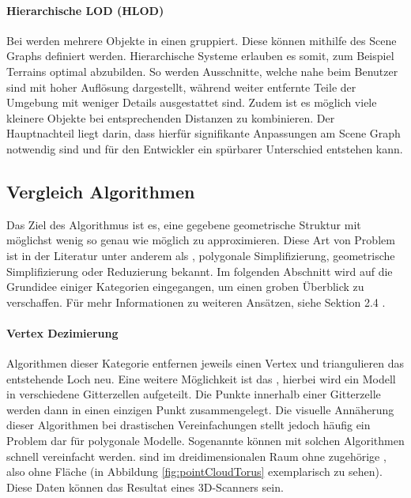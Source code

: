 \paragraph{Hierarchische LOD (HLOD)}
Bei  werden mehrere Objekte in einen  gruppiert. Diese  können mithilfe des \glspl{Scene Graph} definiert werden.
Hierarchische Systeme erlauben es somit, zum Beispiel Terrains optimal abzubilden. So werden Ausschnitte, welche nahe beim Benutzer sind mit hoher Auflösung dargestellt, während weiter entfernte Teile der Umgebung mit weniger Details ausgestattet sind.
Zudem ist es möglich viele kleinere Objekte bei entsprechenden Distanzen zu kombinieren.
Der Hauptnachteil liegt darin, dass hierfür signifikante Anpassungen am \gls{Scene Graph} notwendig sind und für den Entwickler ein spürbarer Unterschied entstehen kann.

\pagebreak

\subsection{Vergleich Algorithmen}
\label{chap:lodAlgorithmComparison}

Das Ziel des Algorithmus ist es, eine gegebene geometrische Struktur mit möglichst wenig  so genau wie möglich zu approximieren.
Diese Art von Problem ist in der Literatur unter anderem als , polygonale Simplifizierung, geometrische Simplifizierung oder  Reduzierung bekannt.
Im folgenden Abschnitt wird auf die Grundidee einiger Kategorien eingegangen, um einen groben Überblick zu verschaffen.
Für mehr Informationen zu weiteren Ansätzen, siehe  Sektion 2.4 \cite{quadridBasedSurfaceSimplification}.

\paragraph{Vertex Dezimierung}
Algorithmen dieser Kategorie entfernen jeweils einen Vertex und triangulieren das entstehende Loch neu.
Eine weitere Möglichkeit ist das , hierbei wird ein Modell in verschiedene Gitterzellen aufgeteilt. Die Punkte innerhalb einer Gitterzelle werden dann in einen einzigen Punkt zusammengelegt. Die visuelle Annäherung dieser Algorithmen bei drastischen Vereinfachungen stellt jedoch häufig ein Problem dar für polygonale Modelle. Sogenannte  können mit solchen Algorithmen schnell vereinfacht werden.
 sind  im dreidimensionalen Raum ohne zugehörige , also ohne Fläche (in Abbildung \ref{fig:pointCloudTorus} exemplarisch zu sehen). Diese Daten können das Resultat eines 3D-Scanners sein.

